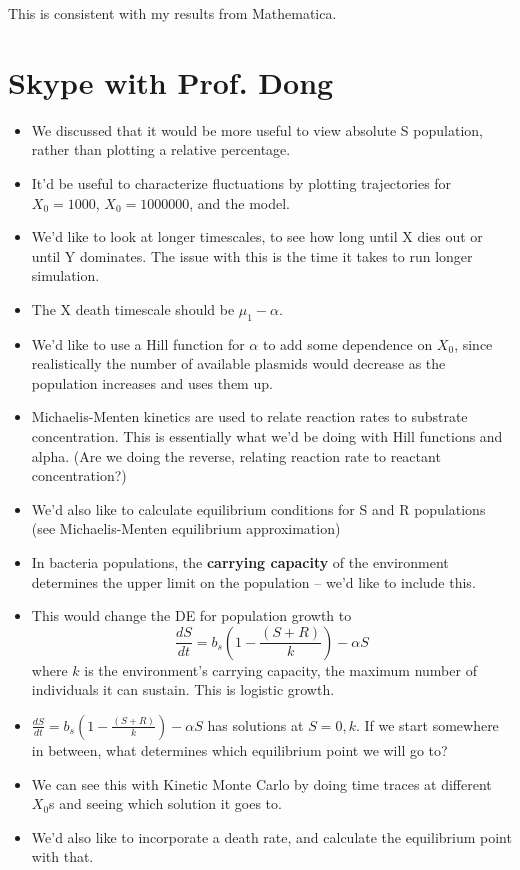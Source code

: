 \documentclass[oneside]{labbook}
\begin{document}
This is consistent with my results from Mathematica.


\section*{Skype with Prof. Dong}
\begin{itemize}
\item We discussed that it would be more useful to view absolute S population, rather
than plotting a relative percentage.
\item It'd be useful to characterize fluctuations by plotting trajectories for
$X_0 = 1000$, $X_0 = 1000000$, and the model.
\item We'd like to look at longer timescales, to see how long until X dies out
or until Y dominates. The issue with this is the time it takes to run longer
simulation.
\item The X death timescale should be $\mu_1 - \alpha$.
\item We'd like to use a Hill function for $\alpha$ to add some dependence on
$X_0$, since realistically the number of available plasmids would decrease as
the population increases and uses them up.
\item Michaelis-Menten kinetics are used to relate reaction rates to substrate
concentration. This is essentially what we'd be doing with Hill functions and
alpha. (Are we doing the reverse, relating reaction rate to reactant concentration?)
\item We'd also like to calculate equilibrium conditions for S and R populations
(see Michaelis-Menten equilibrium approximation)
\vspace{9mm}
\item In bacteria populations, the \textbf{carrying capacity} of the environment
determines the upper limit on the population -- we'd like to include this.
\item This would change the DE for population growth to
\begin{equation}
\frac{dS}{dt} = b_s \left( 1 - \frac{(S+R)}{k}\right) - \alpha S
\end{equation}
where $k$ is the environment's carrying capacity, the maximum number of individuals
it can sustain. This is logistic growth.
\item $\frac{dS}{dt} = b_s \left( 1 - \frac{(S+R)}{k}\right) - \alpha S$ has
solutions at $S=0,k$. If we start somewhere in between, what determines which
equilibrium point we will go to?
\item We can see this with Kinetic Monte Carlo by doing time traces at
different $X_0$s and seeing which solution it goes to.
\vspace{9mm}
\item We'd also like to incorporate a death rate, and calculate the equilibrium
point with that.
\end{itemize}
\end{document}
